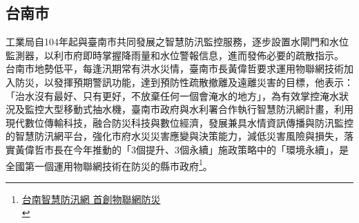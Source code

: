 \documentclass[a4paper,12pt]{article}
\begin{document}
\subsection{台南市}
\label{sec:org4eccf42}
工業局自104年起與臺南市共同發展之智慧防汛監控服務，逐步設置水閘門和水位監測器，以利市府即時掌握降雨量和水位警報信息，進而發佈必要的疏散指示。\\

台南市地勢低平，每逢汛期常有洪水災情，臺南市長黃偉哲要求運用物聯網技術加入防災，以發揮預期警訊功能，達到預防性疏散撤離及遠離災害的目標，他表示：「治水沒有最好、只有更好，不放棄任何一個會淹水的地方」，為有效掌控淹水狀況及監控大型移動式抽水機，臺南市政府與水利署合作執行智慧防汛網計畫，利用現代數位傳輸科技，融合防災科技與數位經濟，發展兼具水情資訊傳播與防汛監控的智慧防汛網平台，強化市府水災災害應變與決策能力，減低災害風險與損失，落實黃偉哲市長在今年推動的「3個提升、3個永續」施政策略中的「環境永續」，是全國第一個運用物聯網技術在防災的縣市政府\footnote{\href{https://money.udn.com/money/story/5722/4508978}{台南智慧防汛網 首創物聯網防災}\\\label{org34797d3}}。\\
\end{document}
